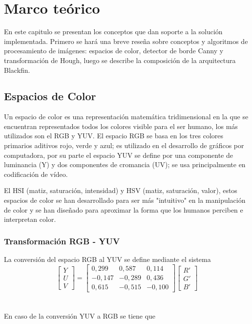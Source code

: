\chapter{Marco teórico}

\label{ch:marco}

En este capitulo se presentan los conceptos que dan soporte a la solución implementada. Primero se hará una breve reseña sobre conceptos y algoritmos de procesamiento de imágenes: espacios de color, detector de borde Canny y transformación de Hough, luego se describe la composición de la arquitectura Blackfin.

\section{Espacios de Color}

Un espacio de color es una representación matemática tridimensional en la que se encuentran representados todos los
colores visible para el ser humano, los más utilizados son el RGB y YUV. El espacio RGB se basa en los tres colores
primarios aditivos rojo, verde y azul; es utilizado en el desarrollo de gráficos por computadora, por su parte el espacio
YUV se define por una componente de luminancia (Y) y dos componentes de cromancia (UV); se usa principalmente en
codificación de vídeo.  

El HSI (matiz, saturación, intensidad) y HSV (matiz, saturación, valor), estos espacios de color se han desarrollado para
ser más "intuitivo" en la manipulación de color y se han diseñado para aproximar la forma que los humanos perciben e
interpretan color. 
%
\subsection{Transformación RGB - YUV}

La conversión del espacio RGB al YUV se define mediante el sistema
\begin{equation}
\begin{bmatrix}
Y \\ 
U \\ 
V
\end{bmatrix} =
\begin{bmatrix}
0,299 & 0,587 & 0,114 \\ 
-0,147 & -0,289 & 0,436 \\ 
0,615 & - 0,515 & - 0,100
\end{bmatrix}
\begin{bmatrix}
R' \\ 
G' \\ 
B'
\end{bmatrix}  
\end{equation}
\\
\\
En caso de la conversión YUV a RGB se tiene que 

